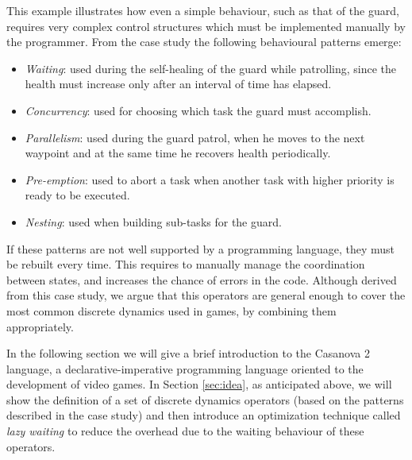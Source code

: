 This example illustrates how even a simple behaviour, such as that of the guard, requires very complex control structures which must be implemented manually by the programmer. From the case study the following behavioural patterns emerge:

\begin{itemize}

\item \textit{Waiting}: used during the self-healing of the guard while patrolling, since the health must increase only after an interval of time has elapsed.

\item \textit{Concurrency}: used for choosing which task the guard must accomplish.

\item \textit{Parallelism}: used during the guard patrol, when he moves to the next waypoint and at the same time he recovers health periodically.

\item \textit{Pre-emption}: used to abort a task when another task with higher priority is ready to be executed.

\item \textit{Nesting}: used when building sub-tasks for the guard.
\end{itemize}

If these patterns are not well supported by a programming language, they must be rebuilt every time. This requires to manually manage the coordination between states, and increases the chance of errors in the code. Although derived from this case study, we argue that this operators are general enough to cover the most common discrete dynamics used in games, by combining them appropriately.

\vspace{0.5cm}
In the following section we will give a brief introduction to the Casanova 2 language, a declarative-imperative programming language oriented to the development of video games. In Section \ref{sec:idea}, as anticipated above, we will show the definition of a set of discrete dynamics operators (based on the patterns described in the case study) and then introduce an optimization technique called \textit{lazy waiting} to reduce the overhead due to the waiting behaviour of these operators.

